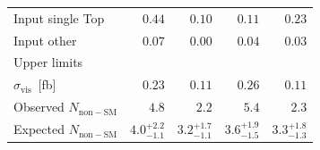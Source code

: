 \begin{table}[p]
\begin{center}
\begin{tabular}{lrrrr}
      Input single Top               & $0.44$                & $0.10$                & $0.11$                & $0.23$             \\[1ex]
      Input other                    & $0.07$                & $0.00$                & $0.04$                & $0.03$             \\
      \midrule
      Upper limits \\
      \midrule
      $\sigma_\mathrm{vis}$~[fb]     & $0.23$                & $0.11$                & $0.26$                & $0.11$                \\[1ex]
      Observed $N_\mathrm{non-SM}$   & $4.8$                 & $2.2$                 & $5.4$                 & $2.3$                 \\[1ex]
      Expected $N_\mathrm{non-SM}$   & ${4.0}^{+2.2}_{-1.1}$ & ${3.2}^{+1.7}_{-1.1}$ & ${3.6}^{+1.9}_{-1.5}$ & ${3.3}^{+1.8}_{-1.3}$ \\
      \bottomrule
    \end{tabular}
  \end{center}
\end{table}

